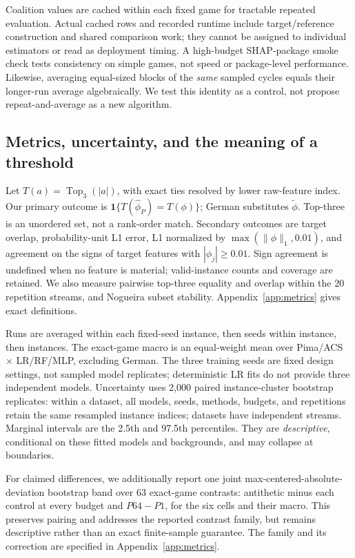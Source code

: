 \documentclass{article}
\newcommand{\Top}{\operatorname{Top}_3}
\newcommand{\ind}{\mathbf{1}}
\begin{document}
Coalition values are cached within each fixed game for tractable repeated evaluation. Actual cached rows and recorded runtime include target/reference construction and shared comparison work; they cannot be assigned to individual estimators or read as deployment timing. A high-budget SHAP-package smoke check tests consistency on simple games, not speed or package-level performance. Likewise, averaging equal-sized blocks of the \emph{same} sampled cycles equals their longer-run average algebraically. We test this identity as a control, not propose repeat-and-average as a new algorithm.

\subsection{Metrics, uncertainty, and the meaning of a threshold}
Let $T(a)=\Top(|a|)$, with exact ties resolved by lower raw-feature index. Our primary outcome is $\ind\{T(\widehat\phi_P)=T(\phi)\}$; German substitutes $\widetilde\phi$. Top-three is an unordered set, not a rank-order match. Secondary outcomes are target overlap, probability-unit L1 error, L1 normalized by $\max(\|\phi\|_1,0.01)$, and agreement on the signs of target features with $|\phi_j|\geq0.01$. Sign agreement is undefined when no feature is material; valid-instance counts and coverage are retained. We also measure pairwise top-three equality and overlap within the 20 repetition streams, and Nogueira subset stability. Appendix~\ref{app:metrics} gives exact definitions.

Runs are averaged within each fixed-seed instance, then seeds within instance, then instances. The exact-game macro is an equal-weight mean over Pima/ACS $\times$ LR/RF/MLP, excluding German. The three training seeds are fixed design settings, not sampled model replicates; deterministic LR fits do not provide three independent models. Uncertainty uses 2,000 paired instance-cluster bootstrap replicates: within a dataset, all models, seeds, methods, budgets, and repetitions retain the same resampled instance indices; datasets have independent streams. Marginal intervals are the 2.5th and 97.5th percentiles. They are \emph{descriptive}, conditional on these fitted models and backgrounds, and may collapse at boundaries.

For claimed differences, we additionally report one joint max-centered-absolute-deviation bootstrap band over 63 exact-game contrasts: antithetic minus each control at every budget and $P64-P1$, for the six cells and their macro. This preserves pairing and addresses the reported contrast family, but remains descriptive rather than an exact finite-sample guarantee. The family and its correction are specified in Appendix~\ref{app:metrics}.
\end{document}
